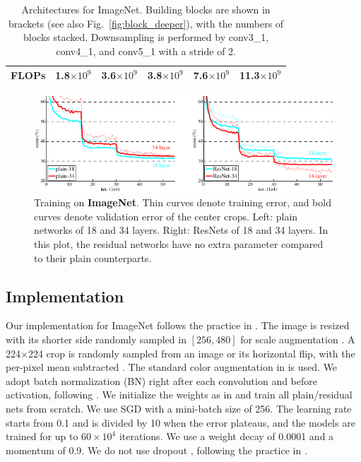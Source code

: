 \documentclass[10pt,twocolumn,letterpaper]{article}
\begin{document}
\begin{table}[t]
\begin{center}
{\begin{tabular}{c|c|c|c|c|c|c}
        \hline
        \multicolumn{2}{c|}{FLOPs} & 1.8$\times10^9$               & 3.6$\times10^9$                                      & 3.8$\times10^9$ & 7.6$\times10^9$       & 11.3$\times10^9$                                \\
        \hline
      \end{tabular}
    }
  \end{center}
  \vspace{-.5em}
  \caption{Architectures for ImageNet. Building blocks are shown in brackets (see also Fig.~\ref{fig:block_deeper}), with the numbers of blocks stacked. Downsampling is performed by conv3\_1, conv4\_1, and conv5\_1 with a stride of 2.
  }
  \label{tab:arch}
  \vspace{-.5em}
\end{table}

\begin{figure}[t]
  \begin{center}
    \includegraphics[width=0.86\linewidth]{eps/imagenet}
  \end{center}
  \vspace{-1.2em}
  \caption{Training on \textbf{ImageNet}. Thin curves denote training error, and bold curves denote validation error of the center crops. Left: plain networks of 18 and 34 layers. Right: ResNets of 18 and 34 layers. In this plot, the residual networks have no extra parameter compared to their plain counterparts.}
  \label{fig:imagenet}
\end{figure}

\subsection{Implementation}
\label{sec:impl}

Our implementation for ImageNet follows the practice in \cite{Krizhevsky2012,Simonyan2015}. The image is resized with its shorter side randomly sampled in $[256, 480]$ for scale augmentation \cite{Simonyan2015}. A 224$\times$224 crop is randomly sampled from an image or its horizontal flip, with the per-pixel mean subtracted \cite{Krizhevsky2012}. The standard color augmentation in \cite{Krizhevsky2012} is used.
We adopt batch normalization (BN) \cite{Ioffe2015} right after each convolution and before activation, following \cite{Ioffe2015}.
We initialize the weights as in \cite{He2015} and train all plain/residual nets from scratch.
We use SGD with a mini-batch size of 256. The learning rate starts from 0.1 and is divided by 10 when the error plateaus, and the models are trained for up to $60\times10^4$ iterations. We use a weight decay of 0.0001 and a momentum of 0.9. We do not use dropout \cite{Hinton2012}, following the practice in \cite{Ioffe2015}.
\end{document}
